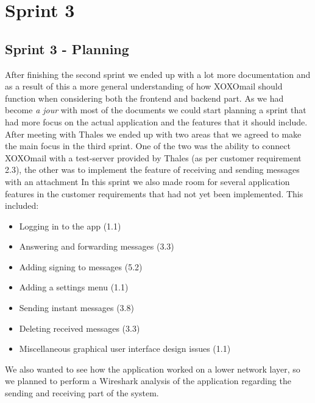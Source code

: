 \chapter{Sprint 3}

\section{Sprint 3 - Planning}
After finishing the second sprint we ended up with a lot more documentation and as a result of this a more general understanding of how XOXOmail should function when considering both the frontend and backend part. As we had become \textit{a jour} with most of the documents we could start planning a sprint that had more focus on the actual application and the features that it should include. 
\newline
\newline
After meeting with Thales we ended up with two areas that we agreed to make the main focus in the third sprint. One of the two was the ability to connect XOXOmail with a test-server provided by Thales (as per customer requirement 2.3), the other was to implement the feature of receiving and sending messages with an attachment
\newline
\newline
In this sprint we also made room for several application features in the customer requirements that had not yet been implemented. This included:
\begin{itemize}
\item{}Logging in to the app (1.1)
\item{}Answering and forwarding messages (3.3)
\item{}Adding signing to messages (5.2)
\item{}Adding a settings menu (1.1)
\item{}Sending instant messages (3.8)
\item{}Deleting received messages (3.3)
\item{}Miscellaneous graphical user interface design issues (1.1)
\end{itemize}

We also wanted to see how the application worked on a lower network layer, so we planned to perform a Wireshark analysis of the application regarding the sending and receiving part of the system. 

\newpage

